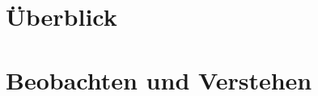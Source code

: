 \documentclass[twocolumn]{article}
\begin{document}
  \twocolumn[
    
    
  ]
  
  
  
  
  
  \section{Überblick} %
  \label{sec:uberblick}
  
  
  \section{Beobachten und Verstehen} %
  \label{sec:beobachten_und_verstehen}
  
  
  
  
  
\end{document}

